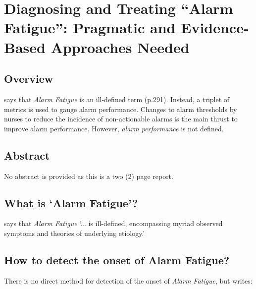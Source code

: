 \chapter{Diagnosing and Treating “Alarm Fatigue”: Pragmatic and Evidence-Based Approaches Needed}

\section{Overview}

\citet{rayo2016diagnosing} says that \textit{Alarm Fatigue} is an ill-defined term (p.291). Instead, a triplet of metrics is used to gauge alarm performance. Changes to alarm thresholds by nurses to reduce the incidence of non-actionable alarms is the main thrust to improve alarm performance. However, \textit{alarm performance} is not defined.

\section{Abstract}

No abstract is provided as this is a two (2) page report.

\section{What is `Alarm Fatigue'?}

\citet[p.291]{rayo2016diagnosing} says that \textit{Alarm Fatigue} `... is ill-defined, encompassing myriad observed symptoms and theories of underlying etiology.' \\

\section{How to detect the onset of Alarm Fatigue?}

There is no direct method for detection of the onset of \textit{Alarm Fatigue}, but \citet[p.292]{rayo2016diagnosing} writes: \\

